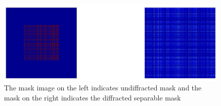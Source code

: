 \begin{figure}[ht]
\includegraphics[width=\linewidth]{pics/diffracted_mask}
\caption{The mask image on the left indicates undiffracted mask and the mask on the right indicates the diffracted separable mask}
\label{fig:moon_image}
\end{figure}